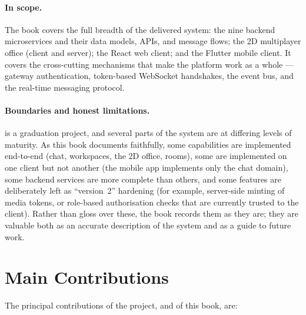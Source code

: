 \paragraph{In scope.} The book covers the full breadth of the delivered system:
the nine backend microservices and their data models, APIs, and message flows;
the 2D multiplayer office (client and server); the React web client; and the
Flutter mobile client. It covers the cross-cutting mechanisms that make the
platform work as a whole --- gateway authentication, token-based WebSocket
handshakes, the event bus, and the real-time messaging protocol.

\paragraph{Boundaries and honest limitations.} \voname{} is a graduation
project, and several parts of the system are at differing levels of maturity. As
this book documents faithfully, some capabilities are implemented end-to-end
(chat, workspaces, the 2D office, rooms), some are implemented on one client but
not another (the mobile app implements only the chat domain), some backend
services are more complete than others, and some features are deliberately left
as ``version~2'' hardening (for example, server-side minting of media tokens, or
role-based authorisation checks that are currently trusted to the client).
Rather than gloss over these, the book records them as they are; they are
valuable both as an accurate description of the system and as a guide to future
work.

\section{Main Contributions}

The principal contributions of the project, and of this book, are:

